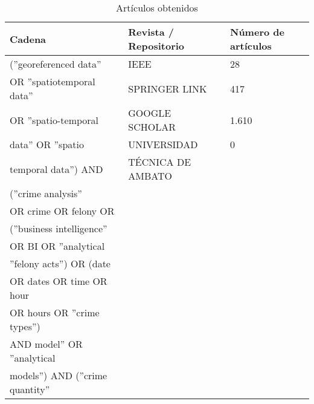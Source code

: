 \begin{table}[!ht]
    \begin{center}
        \begin{threeparttable}
            \caption{Artículos obtenidos}
            \label{table:articulosobtenidos}
            \begin{tabular}{|l|l|l|}
                \hline
                \textbf{Cadena}                   & \textbf{Revista / Repositorio} & \textbf{Número de artículos} \\ \hline
                (''georeferenced data''           & IEEE                           & 28                           \\
                OR ''spatiotemporal data''        & SPRINGER LINK                  & 417                          \\
                OR ''spatio-temporal              & GOOGLE SCHOLAR                 & 1.610                        \\
                data'' OR ''spatio                & UNIVERSIDAD                    & 0                            \\
                temporal data'') AND              & TÉCNICA DE AMBATO              &                              \\
                (''crime analysis''               &                                &                              \\
                OR crime OR felony OR             &                                &                              \\
                (''business intelligence''        &                                &                              \\
                OR BI OR ''analytical             &                                &                              \\
                ''felony acts'') OR (date         &                                &                              \\
                OR dates OR time OR  hour         &                                &                              \\
                OR hours OR ''crime types'')      &                                &                              \\
                AND  model'' OR ''analytical      &                                &                              \\
                models'') AND (''crime quantity'' &                                &                              \\

\end{tabular}
\end{threeparttable}
\end{center}
\end{table}
